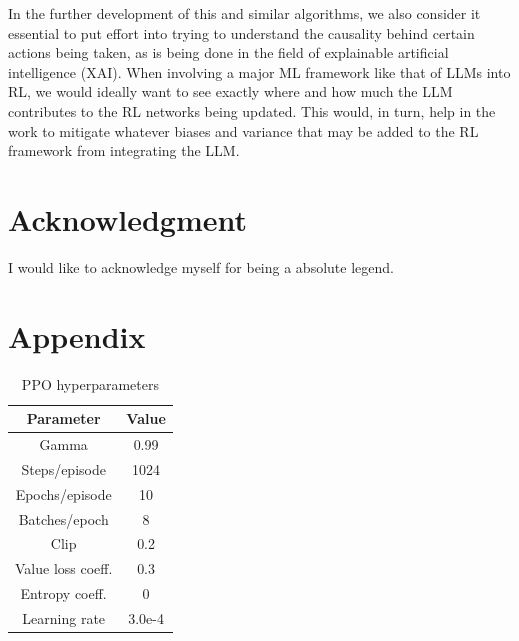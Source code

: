 \documentclass[conference]{IEEEtran}
\begin{document}
In the further development of this and similar algorithms, we also consider it essential to put effort into trying to understand the causality behind certain actions being taken, as is being done in the field of explainable artificial intelligence (XAI). When involving a major ML framework like that of LLMs into RL, we would ideally want to see exactly where and how much the LLM contributes to the RL networks being updated. This would, in turn, help in the work to mitigate whatever biases and variance that may be added to the RL framework from integrating the LLM.

\section*{Acknowledgment}

I would like to acknowledge myself for being a absolute legend.





\section*{Appendix}

\begin{table}[h]
\caption{PPO hyperparameters}
\begin{center}
\label{hyperparams_transposed}
\begin{tabular}{c | c}
Parameter & Value \\
\hline
Gamma & 0.99 \\
Steps/episode & 1024 \\
Epochs/episode & 10 \\
Batches/epoch & 8 \\
Clip & 0.2 \\
Value loss coeff. & 0.3 \\
Entropy coeff. & 0 \\
Learning rate & 3.0e-4 \\
\end{tabular}
\end{center}
\end{table}
\end{document}
